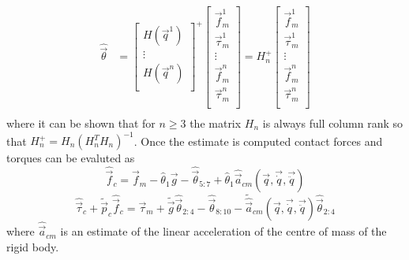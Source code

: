 \[
\begin{split}
  \hat{\vec{\theta}} &=
  \begin{bmatrix}
    H(\vec{q}^{1})\\
    \vdots \\
    H(\vec{q}^{n})\\
  \end{bmatrix}^{+}
  \begin{bmatrix}
    \vec{f}_{m}^{1} \\
    \vec{\tau}_{m}^{1} \\
    \vdots \\
    \vec{f}_{m}^{n} \\
    \vec{\tau}_{m}^{n} \\
  \end{bmatrix}
  =
  H_n^{+}
  \begin{bmatrix}
    \vec{f}_{m}^{1} \\
    \vec{\tau}_{m}^{1} \\
    \vdots \\
    \vec{f}_{m}^{n} \\
    \vec{\tau}_{m}^{n} \\
  \end{bmatrix}\\
\end{split}
\]
where it can be shown that for $n \ge 3$ the matrix $H_n$ is always full column rank
so that $H_n^{+} = H_n(H_n^{T} H_n)^{-1}$.
Once the estimate is computed contact forces and torques can be evaluted as
\[
\hat{\vec{f}}_c = \vec{f}_m - \hat{\theta}_{1} \vec{g} - \hat{\vec{\theta}}_{5:7} + \hat{\theta}_{1} \hat{\vec{a}}_{cm}(\vec{q},\vec{\dot{q}},\vec{\ddot{q}})
\]
\[
\hat{\vec{\tau}}_c + \tilde{\vec{p}}_c  \hat{\vec{f}}_c = \vec{\tau}_m + \tilde{\vec{g}} \hat{\vec{\theta}}_{2:4} - \hat{\vec{\theta}}_{8:10} - \tilde{\hat{\vec{a}}}_{cm}(\vec{q},\vec{\dot{q}},\vec{\ddot{q}}) \hat{\vec{\theta}}_{2:4}
\]
where $\hat{\vec{a}}_{cm}$ is an estimate of the linear acceleration of the centre of mass of the rigid body.
